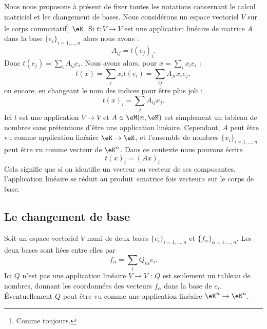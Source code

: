 Nous nous proposons à présent de fixer toutes les notations concernant le calcul matriciel et les changement de bases. Nous considérons un espace vectoriel \( V\) sur le corps commutatif\footnote{Comme toujours.} \( \eK\). Si \( t\colon V\to V \) est une application linéaire de matrice \( A\) dans la base \( \{ e_i \}_{i=1,\ldots, n}\) alors nous avons :
\begin{equation}
    A_{ij}=t(e_j)_i.
\end{equation}
Donc \( t(e_j)=\sum_i A_{ij}e_i\). Nous avons alors, pour \( x=\sum_ix_ie_i\) :
\begin{equation}
    t(x)=\sum_ix_it(e_i)=\sum_{ij}A_{ji}x_ie_j,
\end{equation}
ou encore, en changeant le nom des indices pour être plus joli :
\begin{equation}
    t(x)_i=\sum_jA_{ij}x_j.
\end{equation}
Ici \( t\) est une application \( V\to V\) et \( A\in \eM(n,\eK)\) est simplement un tableau de nombres sans prétentions d'être une application linéaire. Cependant, \( A\) peut être vu comme application linéaire \( \eK\to \eK\), et l'ensemble de nombres \( \{ x_i \}_{i=1,\ldots, n}\) peut être vu comme vecteur de \( \eK^n\). Dans ce contexte nous pouvons écrire
\begin{equation}
    t(x)_i=(Ax)_i.
\end{equation}
Cela signifie que si on identifie un vecteur au vecteur de ses composantes, l'application linéaire se réduit au produit «matrice fois vecteur» sur le corps de base.

\subsection{Le changement de base}

Soit un espace vectoriel \( V\) muni de deux bases \( \{ e_i\}_{i=1,\ldots, n}\) et \( \{ f_{\alpha}\}_{\alpha=1,\ldots, n}\). Les deux bases sont liées entre elles par
\begin{equation}        \label{EQooFRQRooSMsQQB}
    f_{\alpha}=\sum_iQ_{i\alpha}e_i.
\end{equation}
Ici \( Q\) n'est pas une application linéaire \( V\to V\) : \( Q\) est seulement un tableau de nombres, donnant les coordonnées des vecteurs \( f_{\alpha}\) dans la base de \( e_i\). Éventuellement \( Q\) peut être vu comme une application linéaire \( \eK^n\to \eK^n\).

